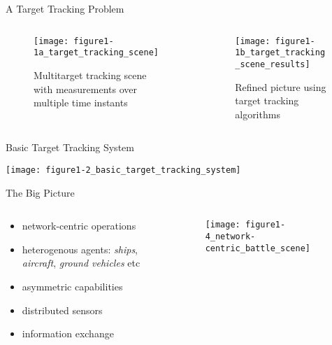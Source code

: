 \documentclass[aspectratio=1610]{beamer}
\begin{document}
\begin{frame}{A Target Tracking Problem}

\begin{columns}

\begin{column}{.45\textwidth}
    \vspace{-3em}
    \begin{figure}
        \centering
        \texttt{[image: figure1-1a\_target\_tracking\_scene]}
        \caption*{Multitarget tracking scene with measurements over multiple time instants}
    \end{figure}
\end{column}

\begin{column}{.45\textwidth}
    \begin{figure}
        \centering
        \texttt{[image: figure1-1b\_target\_tracking\_scene\_results]}
        \caption*{Refined picture using target tracking algorithms}
    \end{figure}
\end{column}

\end{columns}

\end{frame}


\begin{frame}{Basic Target Tracking System}

\begin{center}
    \texttt{[image: figure1-2\_basic\_target\_tracking\_system]}
\end{center}

\end{frame}


\begin{frame}{The Big Picture}

\begin{columns}

\begin{column}{.4\textwidth}
\begin{itemize}
    \item network-centric operations
    \item heterogenous agents: \emph{ships}, \emph{aircraft}, \emph{ground vehicles} etc
    \item asymmetric capabilities
    \item distributed sensors
    \item information exchange
\end{itemize}
\end{column}

\begin{column}{.6\textwidth}
    \begin{figure}
        \centering
        \texttt{[image: figure1-4\_network-centric\_battle\_scene]}
    \end{figure}
\end{column}

\end{columns}

\end{frame}
\end{document}
